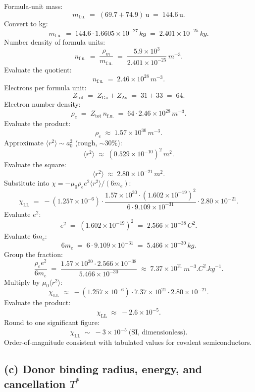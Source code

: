 \documentclass[11pt]{article}
\begin{document}
Formula-unit mass:
\[
m_{\text{f.u.}} \;=\; (69.7+74.9)\,\text{u} \;=\; 144.6\,\text{u}.
\]
Convert to kg:
\[
m_{\text{f.u.}} \;=\; 144.6\cdot 1.6605\times 10^{-27}\,\si{kg} \;=\; 2.401\times 10^{-25}\,\si{kg}.
\]
Number density of formula units:
\[
n_{\text{f.u.}} \;=\; \frac{\rho_m}{m_{\text{f.u.}}} \;=\; \frac{5.9\times 10^3}{2.401\times 10^{-25}}\,\si{m^{-3}}.
\]
Evaluate the quotient:
\[
n_{\text{f.u.}} \;=\; 2.46\times 10^{28}\,\si{m^{-3}}.
\]
Electrons per formula unit:
\[
Z_{\text{tot}} \;=\; Z_{\text{Ga}}+Z_{\text{As}} \;=\; 31+33 \;=\; 64.
\]
Electron number density:
\[
\rho_e \;=\; Z_{\text{tot}}\,n_{\text{f.u.}} \;=\; 64\cdot 2.46\times 10^{28}\,\si{m^{-3}}.
\]
Evaluate the product:
\[
\rho_e \;\approx\; 1.57\times 10^{30}\,\si{m^{-3}}.
\]
Approximate $\langle r^2\rangle\sim a_0^2$ (rough, $\sim 30\%$):
\[
\langle r^2\rangle \;\approx\; (0.529\times 10^{-10})^2\,\si{m^2}.
\]
Evaluate the square:
\[
\langle r^2\rangle \;\approx\; 2.80\times 10^{-21}\,\si{m^2}.
\]
Substitute into $\chi=-\mu_0\rho_e e^2\langle r^2\rangle/(6 m_e)$:
\[
\chi_{\text{LL}} \;=\; -(1.257\times 10^{-6})\cdot\frac{1.57\times 10^{30}\cdot(1.602\times 10^{-19})^2}{6\cdot 9.109\times 10^{-31}}\cdot 2.80\times 10^{-21}.
\]
Evaluate $e^2$:
\[
e^2 \;=\; (1.602\times 10^{-19})^2 \;=\; 2.566\times 10^{-38}\,\si{C^2}.
\]
Evaluate $6m_e$:
\[
6 m_e \;=\; 6\cdot 9.109\times 10^{-31} \;=\; 5.466\times 10^{-30}\,\si{kg}.
\]
Group the fraction:
\[
\frac{\rho_e e^2}{6 m_e} \;=\; \frac{1.57\times 10^{30}\cdot 2.566\times 10^{-38}}{5.466\times 10^{-30}} \;\approx\; 7.37\times 10^{21}\,\si{m^{-3}.C^2.kg^{-1}}.
\]
Multiply by $\mu_0\langle r^2\rangle$:
\[
\chi_{\text{LL}} \;\approx\; -(1.257\times 10^{-6})\cdot 7.37\times 10^{21}\cdot 2.80\times 10^{-21}.
\]
Evaluate the product:
\[
\chi_{\text{LL}} \;\approx\; -2.6\times 10^{-5}.
\]
Round to one significant figure:
\begin{equation}
\boxed{\;\chi_{\text{LL}} \;\sim\; -3\times 10^{-5}\ \text{(SI, dimensionless)}.\;}
\label{eq:chiLL}
\end{equation}
Order-of-magnitude consistent with tabulated values for covalent semiconductors.

\subsection*{(c) Donor binding radius, energy, and cancellation $T^*$}
\end{document}
